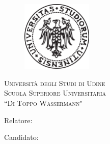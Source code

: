 \begin{titlepage}
    \begin{figure}[!htb]
        \centering
        \includegraphics[keepaspectratio=true,width=0.3\textwidth]{LogoUNIUD.png}
    \end{figure}
    
    \begin{center}
        \LARGE{\textsc{Università degli Studi di Udine}}
        \vspace{5mm}
        \\ \large{\textsc{Scuola Superiore Universitaria \\ “Di Toppo Wassermann"}}
    \end{center}
    
    \vspace{15mm}
    \begin{center}
        \begin{spacing}{1.7}
            {\LARGE{\bf \titoloTesi}}
        \end{spacing}
    \end{center}
    \vspace{20mm}
    
    \begin{minipage}[t]{0.47\textwidth}
        {\large{Relatore:}{\normalsize\vspace{3mm}
        \bf\\ \large{\relatoreTesi}}}
    \end{minipage}
    \hfill
    \begin{minipage}[t]{0.47\textwidth}\raggedleft
        {\large{Candidato:}{\normalsize\vspace{3mm} \bf\\ \large{\autoreTesi}}}
    \end{minipage}
    
    \vspace{45mm}
    \hrulefill
    \\
    
    \end{titlepage}